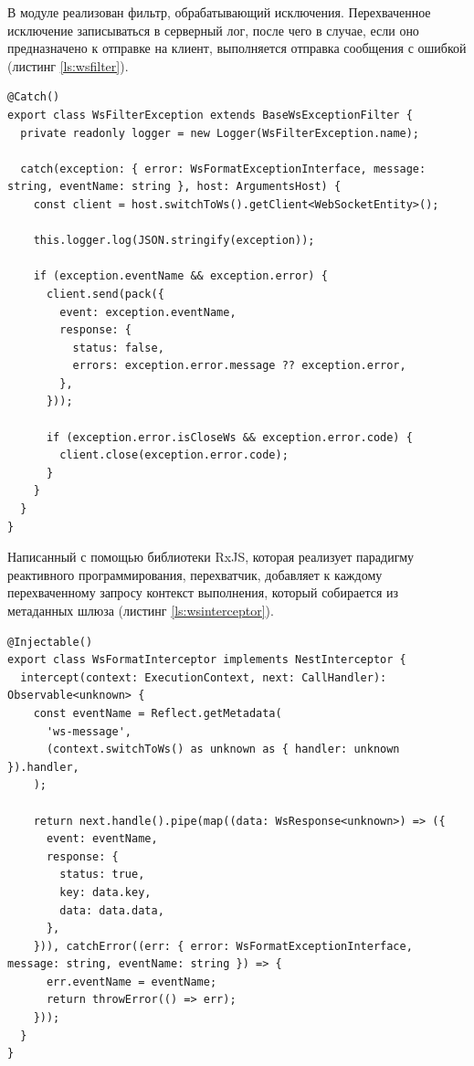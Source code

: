 В модуле реализован фильтр, обрабатывающий исключения. Перехваченное исключение записываться в серверный лог, после чего в случае, если оно предназначено к отправке на клиент, выполняется отправка сообщения с ошибкой (листинг \ref{ls:wsfilter}).

\begin{lstlisting}[caption={Фильтр обрабатывающий WebSocket исключения}, label={ls:wsfilter}]
@Catch()
export class WsFilterException extends BaseWsExceptionFilter {
  private readonly logger = new Logger(WsFilterException.name);

  catch(exception: { error: WsFormatExceptionInterface, message: string, eventName: string }, host: ArgumentsHost) {
    const client = host.switchToWs().getClient<WebSocketEntity>();

    this.logger.log(JSON.stringify(exception));

    if (exception.eventName && exception.error) {
      client.send(pack({
        event: exception.eventName,
        response: {
          status: false,
          errors: exception.error.message ?? exception.error,
        },
      }));

      if (exception.error.isCloseWs && exception.error.code) {
        client.close(exception.error.code);
      }
    }
  }
}
\end{lstlisting}

Написанный с помощью библиотеки RxJS, которая реализует парадигму реактивного программирования, перехватчик, добавляет к каждому перехваченному запросу контекст выполнения, который собирается из метаданных шлюза (листинг \ref{ls:wsinterceptor}).

\begin{lstlisting}[caption={Перехватчик добавляющий контекст выполнения к WebSocket запросу}, label={ls:wsinterceptor}]
@Injectable()
export class WsFormatInterceptor implements NestInterceptor {
  intercept(context: ExecutionContext, next: CallHandler): Observable<unknown> {
    const eventName = Reflect.getMetadata(
      'ws-message',
      (context.switchToWs() as unknown as { handler: unknown }).handler,
    );

    return next.handle().pipe(map((data: WsResponse<unknown>) => ({
      event: eventName,
      response: {
        status: true,
        key: data.key,
        data: data.data,
      },
    })), catchError((err: { error: WsFormatExceptionInterface, message: string, eventName: string }) => {
      err.eventName = eventName;
      return throwError(() => err);
    }));
  }
}
\end{lstlisting}

